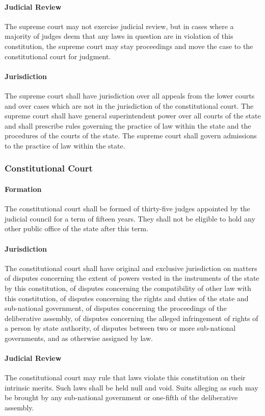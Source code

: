 \documentclass{article}
\begin{document}
\paragraph{Judicial Review}
The supreme court may not exercise judicial review, but in cases where a majority of judges deem that any laws in question are in violation of this constitution, the supreme court may stay proceedings and move the case to the constitutional court for judgment.
\paragraph{Jurisdiction}
The supreme court shall have jurisdiction over all appeals from the lower courts and over cases which are not in the jurisdiction of the constitutional court. The supreme court shall have general superintendent power over all courts of the state and shall prescribe rules governing the practice of law within the state and the procedures of the courts of the state. The supreme court shall govern admissions to the practice of law within the state.
\subsubsection{Constitutional Court}
\paragraph{Formation}
The constitutional court shall be formed of thirty-five judges appointed by the judicial council for a term of fifteen years. They shall not be eligible to hold any other public office of the state after this term.
\paragraph{Jurisdiction}
The constitutional court shall have original and exclusive jurisdiction on matters of disputes concerning the extent of powers vested in the instruments of the state by this constitution, of disputes concerning the compatibility of other law with this constitution, of disputes concerning the rights and duties of the state and sub-national government, of disputes concerning the proceedings of the deliberative assembly, of disputes concerning the alleged infringement of rights of a person by state authority, of disputes between two or more sub-national governments, and as otherwise assigned by law.
\paragraph{Judicial Review}
The constitutional court may rule that laws violate this constitution on their intrinsic merits. Such laws shall be held null and void. Suits alleging as such may be brought by any sub-national government or one-fifth of the deliberative assembly.
\end{document}
